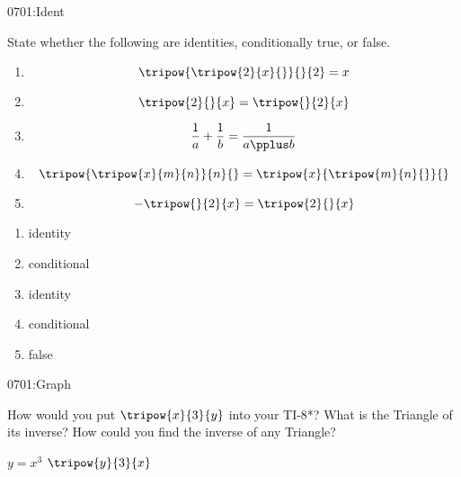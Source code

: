 \begin{defproblem}{0701:Ident}
\begin{onlyproblem}
State whether the following are identities, conditionally true, or false.
\begin{enumerate}
\item $$\tripow{\tripow{2}{x}{}}{}{2} = x$$
\item $$\tripow{2}{}{x} = \tripow{}{2}{x}$$
\item $$\frac{1}{a} + \frac{1}{b} = \frac{1}{a\pplus b}$$
\item $$\tripow{\tripow{x}{m}{n}}{n}{} = \tripow{x}{\tripow{m}{n}{}}{}$$
\item $$-\tripow{}{2}{x} = \tripow{2}{}{x}$$
\end{enumerate}
\end{onlyproblem}
\begin{onlysolution}
\begin{enumerate}
\item identity
\item conditional
\item identity
\item conditional
\item false
\end{enumerate}
\end{onlysolution}
\end{defproblem}

\begin{defproblem}{0701:Graph}
\begin{onlyproblem}
How would you put $\tripow{x}{3}{y}$ into your TI-8*?
What is the Triangle of its inverse?
How could you find the inverse of any Triangle?
\end{onlyproblem}
\begin{onlysolution}
$y=x^3$ 
$\tripow{y}{3}{x}$
\end{onlysolution}
\end{defproblem}
\endinput
